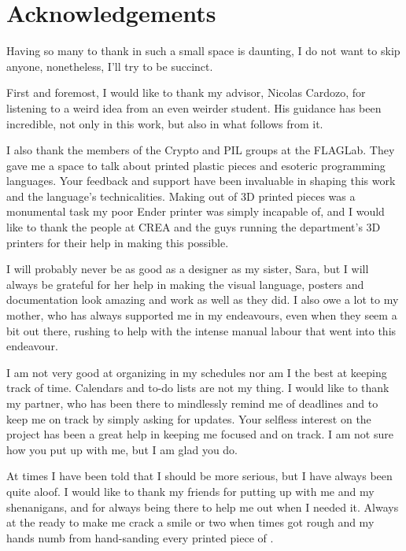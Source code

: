 
\chapter{Acknowledgements}

Having so many to thank in such a small space is daunting, I do not want to skip anyone, nonetheless, I'll try to be succinct.

First and foremost, I would like to thank my advisor, Nicolas Cardozo, for listening to a weird idea from an even weirder student.
His guidance has been incredible, not only in this work, but also in what follows from it.

I also thank the members of the Crypto and PIL groups at the FLAGLab. They gave me a space to talk about printed plastic pieces and
esoteric programming languages. Your feedback and support have been invaluable in shaping this work and the language's technicalities.
Making \sculpt out of 3D printed pieces was a monumental task my poor Ender printer was simply incapable of, and I would like to thank the people at CREA and the guys running the department's 3D printers for their help in making this possible.

I will probably never be as good as a designer as my sister, Sara, but I will always be grateful for
her help in making the \sculpt visual language, posters and documentation look amazing and work as well as they did.
I also owe a lot to my mother, who has always supported me in my endeavours, even when they seem a bit out there, rushing to help with the intense manual labour that went into this endeavour.

I am not very good at organizing in my schedules nor am I the best at keeping track of time. Calendars and to-do lists are not my thing.
I would like to thank my partner, who has been there to mindlessly remind me of deadlines and to keep me on track by simply asking for updates.
Your selfless interest on the project has been a great help in keeping me focused and on track.
I am not sure how you put up with me, but I am glad you do.

At times I have been told that I should be more serious, but I have always been quite aloof.
I would like to thank my friends for putting up with me and my shenanigans, and for always being there to help me out when I needed it.
Always at the ready to make me crack a smile or two when times got rough and my hands numb from hand-sanding every printed piece of \sculpt.
\endinput

